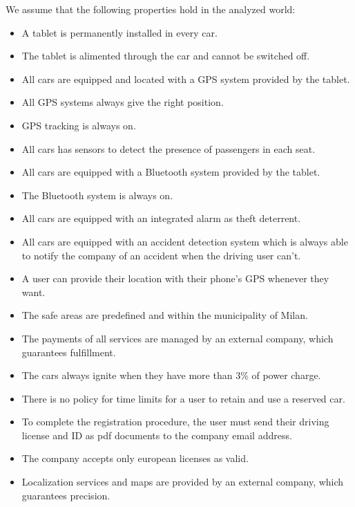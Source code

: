 We assume that the following properties hold in the analyzed world:			
			
			\begin{itemize}
				\item A tablet is permanently installed in every car. %
				\item The tablet is alimented through the car and cannot be switched off.
				\item All cars are equipped and located with a GPS system provided by the tablet.
				\item All GPS systems always give the right position.
				\item GPS tracking is always on.
				\item All cars has sensors to detect the presence of passengers in each seat.
				\item All cars are equipped with a Bluetooth system provided by the tablet.
				\item The Bluetooth system is always on.
				\item All cars are equipped with an integrated alarm as theft deterrent. %
				\item All cars are equipped with an accident detection system which is always able to notify the company of an accident when the driving user can't. 
				\item A user can provide their location with their phone's GPS whenever they want. 
				\item The safe areas are predefined and within the municipality of Milan.
				\item The payments of all services are managed by an external company, which guarantees fulfillment.
				\item The cars always ignite when they have more than 3\% of power charge.
				\item There is no policy for time limits for a user to retain and use a reserved car. %
				\item To complete the registration procedure, the user must send their driving license and ID as pdf documents to the company email address.
				\item The company accepts only european licenses as valid.
				\item Localization services and maps are provided by an external company, which guarantees precision. 
				
			\end{itemize}